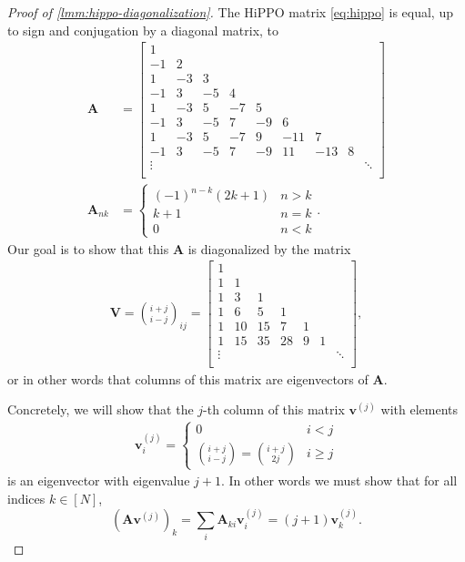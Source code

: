 \begin{proof}[Proof of \cref{lmm:hippo-diagonalization}]%
  The HiPPO matrix \eqref{eq:hippo} is equal, up to sign and conjugation by a diagonal matrix, to
  \begin{align*}
    \bm{A} &=
    \begin{bmatrix}
      1 \\
      -1 & 2 \\
      1 & -3 & 3 \\
      -1 & 3 & -5 & 4 \\
      1 & -3 & 5 & -7 & 5 \\
      -1 & 3 & -5 & 7 & -9 & 6 \\
      1 & -3 & 5 & -7 & 9 & -11 & 7 \\
      -1 & 3 & -5 & 7 & -9 & 11 & -13 & 8 \\
      \vdots & & & & & & & & \ddots \\
    \end{bmatrix}
    \\
    \bm{A}_{nk} &=
    \begin{cases}%
      (-1)^{n-k} (2k+1) & n > k \\
      k+1 & n=k \\
      0 & n<k
    \end{cases}
    .
  \end{align*}
  Our goal is to show that this \( \bm{A} \) is diagonalized by the matrix
  \begin{align*}
    \bm{V} = \binom{i+j}{i-j}_{ij} =
    \begin{bmatrix}
      1 \\
      1 & 1 \\
      1 & 3 & 1 \\
      1 & 6 & 5 & 1 \\
      1 & 10 & 15 & 7 & 1 \\
      1 & 15 & 35 & 28 & 9 & 1 \\
      \vdots & & & & & & \ddots \\
    \end{bmatrix}
    ,
  \end{align*}
  or in other words that columns of this matrix are eigenvectors of \( \bm{A} \).

  Concretely, we will show that the \( j \)-th column of this matrix \( \bm{v}^{(j)} \) with elements
  \begin{align*}
    \bm{v}^{(j)}_i =
    \begin{cases}%
      0 & i < j \\
      \binom{i+j}{i-j} = \binom{i+j}{2j} & i \ge j
    \end{cases}
  \end{align*}
  is an eigenvector with eigenvalue \( j+1 \).
  In other words we must show that for all indices \( k \in [N] \),
  \begin{equation}
    \label{eq:diagonalization-proof}
    (\bm{A}\bm{v}^{(j)})_k = \sum_i \bm{A}_{ki} \bm{v}^{(j)}_{i} = (j+1) \bm{v}^{(j)}_k.
  \end{equation}


\end{proof}
